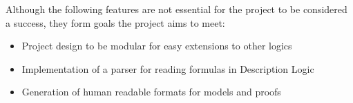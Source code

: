 
Although the following features are not essential for the project to be considered a success, they
form goals the project aims to meet:

\begin{itemize}
\item Project design to be modular for easy extensions to other logics
\item Implementation of a parser for reading formulas in Description Logic
\item Generation of human readable formats for models and proofs
\end{itemize}
